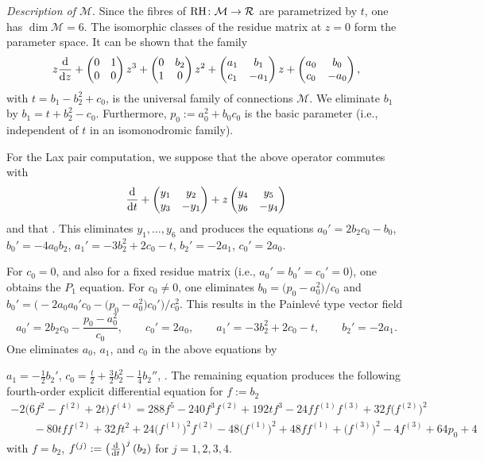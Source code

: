 \documentclass[10pt,a4paper]{amsart}
\numberwithin{equation}{section}
\begin{document}
 {\it Description of $\mathcal{M}$}. Since the fibres of ${\rm RH}\colon\mathcal{M}\rightarrow \mathcal{R}$ are
parametrized by $t$, one has $\dim \mathcal{M}=6$. The isomorphic classes of the residue matrix at $z=0$ form the parameter space.
It can be shown that the family
 \[ z\frac{{\rm d}}{{\rm d}z}+ \begin{pmatrix}0 & 1\\0& 0\end{pmatrix} z^3+
\begin{pmatrix} 0 &b_2\\1&0\end{pmatrix}z^2+
\begin{pmatrix} a_1 &b_1\\ c_1& -a_1\end{pmatrix} z+ \begin{pmatrix}a_0 & b_0 \\c_0& -a_0\end{pmatrix},\]
with $t=b_1-b_2^2+c_0$, is the universal family of connections $\mathcal{M}$. We eliminate $b_1$ by $b_1=t+b_2^2-c_0$.
Furthermore, $p_0:=a_0^2+b_0c_0$ is the basic parameter (i.e., independent of $t$ in an isomonodromic family).

For the Lax pair computation, we suppose that the above operator commutes with
\[
\frac{{\rm d}}{{\rm d}t}+\begin{pmatrix} y_1&y_2\\y_3& -y_1 \end{pmatrix}+z\begin{pmatrix} y_4& y_5\\y_6& -y_4 \end{pmatrix}
\]
 and that .
This eliminates $y_1,\dots ,y_6$ and produces the equations
$a_0'=2b_2c_0-b_0$, $ b_0'=-4a_0b_2$, $ a_1'=-3b_2^2+2c_0-t$, $ b_2'=-2a_1$, $ c_0'=2a_0$.


 For $c_0=0$, and also for a fixed residue matrix (i.e., $a_0'=b_0'=c_0'=0$), one obtains the $P_1$ equation.
For $c_0\neq 0$, one eliminates $b_0=\bigl(p_0-a_0^2\bigr)/c_0$ and
$b_0'=\bigl(-2a_0a_0'c_0-\bigl(p_0-a_0^2\bigr)c_0'\bigr)/c_0^2$. This results in the Painlev\'e type vector field
\[a_0'=2b_2c_0-\frac{p_0-a_0^2}{c_0},\qquad c_0'=2a_0,\qquad a_1'=-3b_2^2+2c_0-t,\qquad b_2'=-2a_1.\]
One eliminates $a_0$, $a_1$, and $c_0$ in the above equations by

$a_1=-\frac{1}{2}b_2'$, $c_0=\frac{t}{2}+\frac{3}{2}b_2^2-\frac{1}{4}b_2''$, . The remaining equation produces the following fourth-order explicit differential equation for $f:=b_2$
 \begin{gather*}
 -2\bigl(6f^2-f^{(2)}+2t\bigr)f^{(4)}=288f^5-240f^3f^{(2)}+192tf^3-24ff^{(1)}f^{(3)}+32f\bigl(f^{(2)}\bigr)^2\\
 \qquad-80tff^{(2)}+32ft^2+
 24\bigl(f^{(1)}\bigr)^2f^{(2)} -48 \bigl(f^{(1)}\bigr)^2+48ff^{(1)}+\bigl(f^{(3)}\bigr)^2-4f^{(3)}+64p_0+4
\end{gather*}
with $f=b_2$, $f^{ (j) }:=\left( \frac{{\rm d}}{{\rm d}t} \right)^j (b_2)$ for $j=1,2,3,4$.
\end{document}
